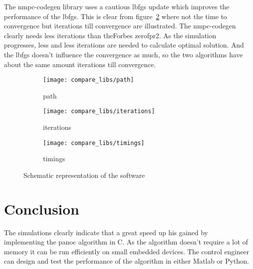 The nmpc-codegen library uses a cautious lbfgs update which improves the performance of the lbfgs. This is clear from figure~\ref{fig:iterations trailer example} where not the time to convergence but iterations till convergence are illustrated. The nmpc-codegen clearly needs less iterations than theForbes zerofpr2. As the simulation progresses, less and less iterations are needed to calculate optimal solution. And the lbfgs doesn't influence the convergence as much, so the two algorithms have about the same amount iterations till convergence.
\begin{figure}[H]
	\centering
	\begin{subfigure}[b]{0.45\textwidth}
		\centering
		\texttt{[image: compare\_libs/path]}
		\caption{path}
		\label{fig:solution path trailer example}
	\end{subfigure}
	
	\begin{subfigure}[b]{0.45\textwidth}
		\centering
		\texttt{[image: compare\_libs/iterations]}
		\caption{iterations}
		\label{fig:iterations trailer example}
	\end{subfigure}
	\hfill
	\begin{subfigure}[b]{0.45\textwidth}
		\centering
		\texttt{[image: compare\_libs/timings]}
		\caption{timings}
		\label{fig:timings trailer example}
	\end{subfigure}
	\caption{Schematic representation of the software}
\end{figure}

\section{Conclusion}

The simulations clearly indicate that a great speed up his gained by implementing the panoc algorithm in C. As the algorithm doesn't require a lot of memory it can be run efficiently on small embedded devices. The control engineer can design and test the performance of the algorithm in either Matlab or Python.